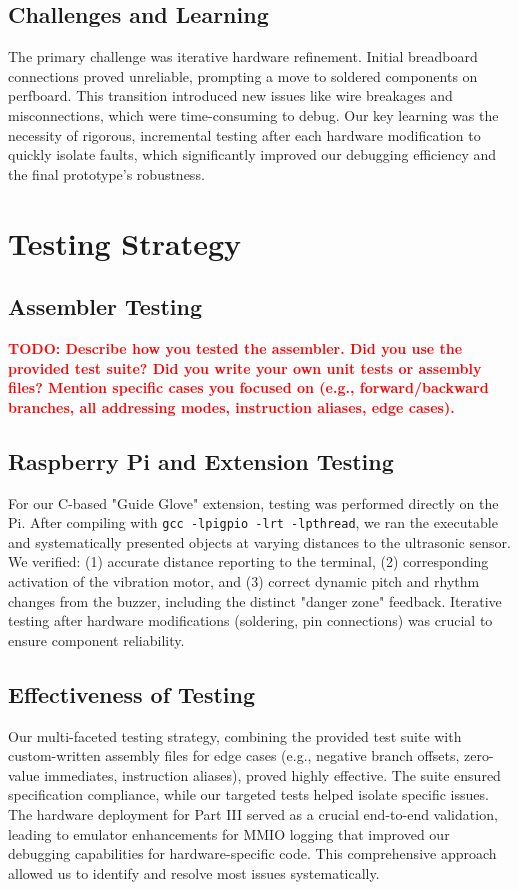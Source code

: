 \documentclass[11pt]{article}
\newcommand{\todo}[1]{\textcolor{red}{\textbf{TODO: #1}}}
\begin{document}
\subsection{Challenges and Learning}
The primary challenge was iterative hardware refinement. Initial breadboard connections proved unreliable, prompting a move to soldered components on perfboard. This transition introduced new issues like wire breakages and misconnections, which were time-consuming to debug. Our key learning was the necessity of rigorous, incremental testing after each hardware modification to quickly isolate faults, which significantly improved our debugging efficiency and the final prototype's robustness.


\section{Testing Strategy}

\subsection{Assembler Testing}
\todo{Describe how you tested the assembler. Did you use the provided test suite? Did you write your own unit tests or assembly files? Mention specific cases you focused on (e.g., forward/backward branches, all addressing modes, instruction aliases, edge cases).}

\subsection{Raspberry Pi and Extension Testing}
For our C-based "Guide Glove" extension, testing was performed directly on the Pi. After compiling with \texttt{gcc -lpigpio -lrt -lpthread}, we ran the executable and systematically presented objects at varying distances to the ultrasonic sensor. We verified: (1) accurate distance reporting to the terminal, (2) corresponding activation of the vibration motor, and (3) correct dynamic pitch and rhythm changes from the buzzer, including the distinct "danger zone" feedback. Iterative testing after hardware modifications (soldering, pin connections) was crucial to ensure component reliability.

\subsection{Effectiveness of Testing}
Our multi-faceted testing strategy, combining the provided test suite with custom-written assembly files for edge cases (e.g., negative branch offsets, zero-value immediates, instruction aliases), proved highly effective. The suite ensured specification compliance, while our targeted tests helped isolate specific issues. The hardware deployment for Part III served as a crucial end-to-end validation, leading to emulator enhancements for MMIO logging that improved our debugging capabilities for hardware-specific code. This comprehensive approach allowed us to identify and resolve most issues systematically.
\end{document}
